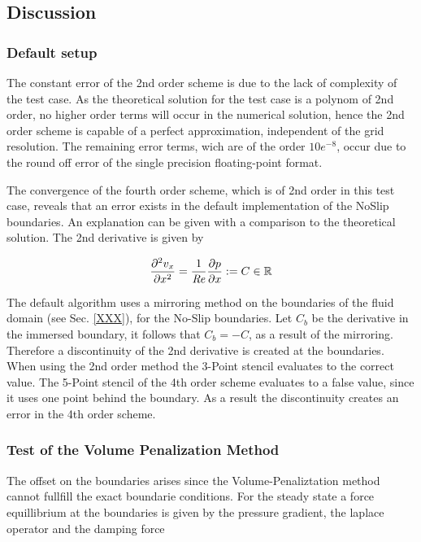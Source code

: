 \clearpage

\subsection{Discussion}
\subsubsection{Default setup}


The constant error of the 2nd order scheme is due to the lack of complexity of the test case.
As the theoretical solution for the test case is a polynom of 2nd order,
no higher order terms will occur in the numerical solution, hence the
2nd order scheme is capable of a perfect approximation, independent of the
grid resolution. The remaining error terms, wich  are of the order $10e^{-8}$,
occur due to the round off error of the single precision floating-point format.

The convergence of the fourth order scheme, which is of 2nd order in this test case,
reveals that an error exists in the default implementation of the NoSlip boundaries.
An explanation can be given with a comparison to the theoretical solution.
The 2nd derivative is given by

\begin{align}
    \pdn[^2 v_x]{x^2} = \frac{1}{\Rey}\pdn[p]{x} := C\in\mathbb{R}
\end{align}

The default algorithm uses a mirroring method on the boundaries of the fluid domain (see Sec. \ref{XXX}), for the No-Slip boundaries.
Let $C_b$ be the derivative in the immersed boundary, it follows that $C_b = - C$, as a result of the mirroring.
Therefore a discontinuity of the 2nd derivative is created at the boundaries.
When using the 2nd order method the 3-Point stencil evaluates to the correct value.
The 5-Point stencil of the 4th order scheme evaluates to a false value, since it uses one point behind the boundary.
As a result the discontinuity creates an error in the 4th order scheme.

\subsubsection{Test of the Volume Penalization Method}

The offset on the boundaries arises since the Volume-Penaliztation method cannot fullfill the exact boundarie conditions.
For the steady state a force equillibrium at the boundaries is given by the pressure gradient, the laplace operator and the damping force

